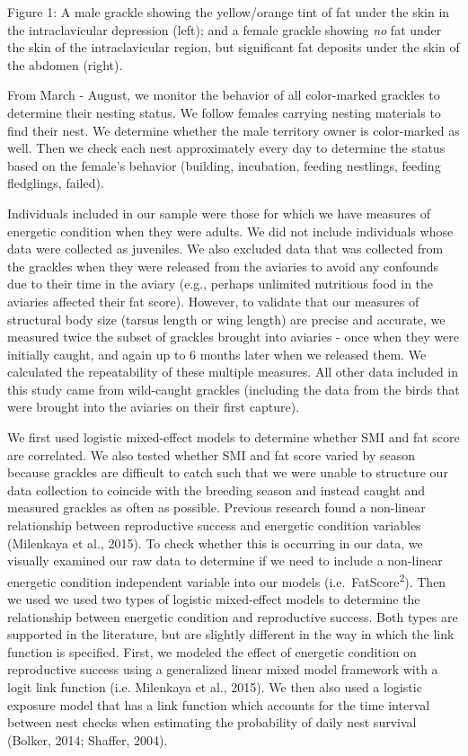 \documentclass[
]{article}
\begin{document}
Figure 1: A male grackle showing the yellow/orange tint of fat under the
skin in the intraclavicular depression (left); and a female grackle
showing \emph{no} fat under the skin of the intraclavicular region, but
significant fat deposits under the skin of the abdomen (right).

From March - August, we monitor the behavior of all color-marked
grackles to determine their nesting status. We follow females carrying
nesting materials to find their nest. We determine whether the male
territory owner is color-marked as well. Then we check each nest
approximately every day to determine the status based on the female's
behavior (building, incubation, feeding nestlings, feeding fledglings,
failed).

Individuals included in our sample were those for which we have measures
of energetic condition when they were adults. We did not include
individuals whose data were collected as juveniles. We also excluded
data that was collected from the grackles when they were released from
the aviaries to avoid any confounds due to their time in the aviary
(e.g., perhaps unlimited nutritious food in the aviaries affected their
fat score). However, to validate that our measures of structural body
size (tarsus length or wing length) are precise and accurate, we
measured twice the subset of grackles brought into aviaries - once when
they were initially caught, and again up to 6 months later when we
released them. We calculated the repeatability of these multiple
measures. All other data included in this study came from wild-caught
grackles (including the data from the birds that were brought into the
aviaries on their first capture).

We first used logistic mixed-effect models to determine whether SMI and
fat score are correlated. We also tested whether SMI and fat score
varied by season because grackles are difficult to catch such that we
were unable to structure our data collection to coincide with the
breeding season and instead caught and measured grackles as often as
possible. Previous research found a non-linear relationship between
reproductive success and energetic condition variables (Milenkaya et
al., 2015). To check whether this is occurring in our data, we visually
examined our raw data to determine if we need to include a non-linear
energetic condition independent variable into our models
(i.e.~FatScore\textsuperscript{2}). Then we used we used two types of
logistic mixed-effect models to determine the relationship between
energetic condition and reproductive success. Both types are supported
in the literature, but are slightly different in the way in which the
link function is specified. First, we modeled the effect of energetic
condition on reproductive success using a generalized linear mixed model
framework with a logit link function (i.e. Milenkaya et al., 2015). We
then also used a logistic exposure model that has a link function which
accounts for the time interval between nest checks when estimating the
probability of daily nest survival (Bolker, 2014; Shaffer, 2004).
\end{document}
